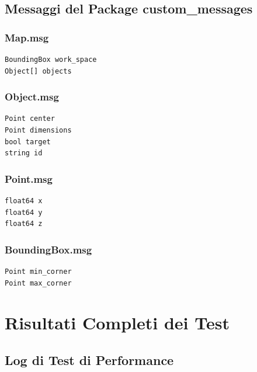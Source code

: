 \documentclass[12pt,a4paper,twoside,openright]{book}
\begin{document}
\section{Messaggi del Package custom\_messages}

\subsection{Map.msg}
\begin{lstlisting}[caption={Map.msg}]
BoundingBox work_space
Object[] objects
\end{lstlisting}

\subsection{Object.msg}
\begin{lstlisting}[caption={Object.msg}]
Point center
Point dimensions
bool target
string id
\end{lstlisting}

\subsection{Point.msg}
\begin{lstlisting}[caption={Point.msg}]
float64 x
float64 y
float64 z
\end{lstlisting}

\subsection{BoundingBox.msg}
\begin{lstlisting}[caption={BoundingBox.msg}]
Point min_corner
Point max_corner
\end{lstlisting}

\chapter{Risultati Completi dei Test}
\label{app:test}

\section{Log di Test di Performance}
\end{document}
